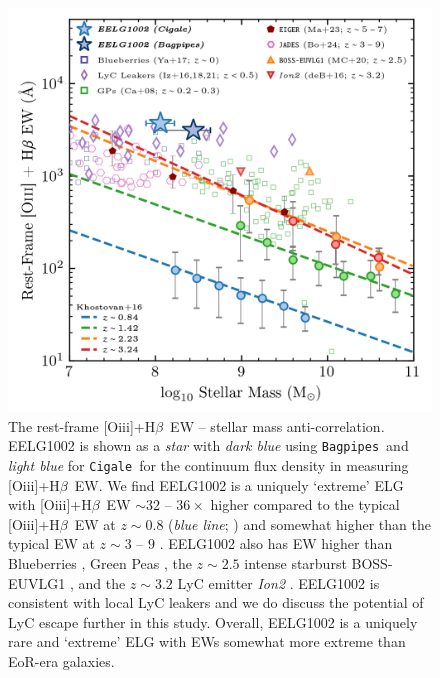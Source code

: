 \documentclass[twocolumn,tight,times,linenumbers]{aastex631}
\newcommand{\hbeta}{H$\beta$}
\newcommand{\oiii}{[O{\sc iii}]}
\newcommand{\cigale}{\texttt{Cigale}}
\newcommand{\bagpipes}{\texttt{Bagpipes}}
\begin{document}
		\begin{figure}
			\centering
			\includegraphics[width=\columnwidth]{figures/EW_OIII_distrib.png}
			\caption{The rest-frame \oiii+\hbeta~EW -- stellar mass anti-correlation. EELG1002 is shown as a \textit{star} with \textit{dark blue} using \bagpipes~and \textit{light blue} for \cigale~for the continuum flux density in measuring \oiii+\hbeta~EW. We find EELG1002 is a uniquely `extreme' ELG with \oiii+\hbeta~EW $\sim 32$ -- $36\times$ higher compared to the typical \oiii$+$\hbeta~EW at $z \sim 0.8$ (\textit{blue line}; \citealt{Khostovan2016}) and somewhat higher than the typical EW at $z \sim 3$ -- $9$ \citep{Khostovan2016, Matthee2023, Boyett2024}. EELG1002 also has EW higher than Blueberries \citep{Yang2017_BB}, Green Peas \citep{Cardamone2009}, the $z \sim 2.5$ intense starburst BOSS-EUVLG1 \citep{Marques-Chaves2020}, and the $z \sim 3.2$ LyC emitter \textit{Ion2} \citep{deBarros2016}. EELG1002 is consistent with local LyC leakers \citep{Izotov2016,Izotov2018,Izotov2021} and we do discuss the potential of LyC escape further in this study. Overall, EELG1002 is a uniquely rare and `extreme' ELG with EWs somewhat more extreme than EoR-era galaxies.}
			\label{fig:EW}
		\end{figure}
\end{document}
